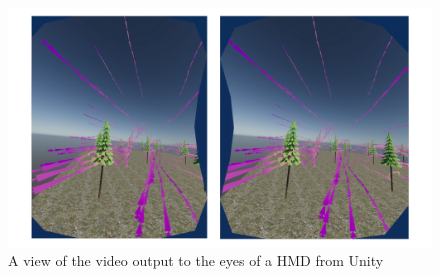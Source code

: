\begin{figure}
\centering
\includegraphics[scale=.18]{Figures/botheyes.png}
\decoRule
\caption[Unity View of Simulation]{A view of the video output to the eyes of a HMD from Unity}
\label{fig:AllEyes}
\end{figure}